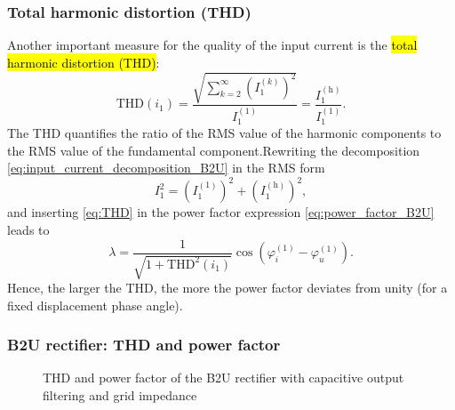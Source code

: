 \begin{frame}
	\frametitle{Total harmonic distortion (THD)}
	Another important measure for the quality of the input current is the \hl{total harmonic distortion (THD)}:
	\begin{equation}
		\mathrm{THD}(i_1) = \frac{\sqrt{\sum_{k=2}^{\infty} \left(I_1^{(k)}\right)^2}}{I_1^{(1)}} = \frac{I_1^{(\mathrm{h})}}{I_1^{(1)}}.
		\label{eq:THD}
	\end{equation}
	The THD quantifies the ratio of the RMS value of the harmonic components to the RMS value of the fundamental component.\pause Rewriting the decomposition \eqref{eq:input_current_decomposition_B2U} in the RMS form
	\begin{equation}
		I_1^2 = \left(I_1^{(1)}\right)^2 + \left(I_1^{(\mathrm{h})}\right)^2,
	\end{equation}\pause
	and inserting \eqref{eq:THD} in the power factor expression \eqref{eq:power_factor_B2U} leads to
	\begin{equation}
		\lambda = \frac{1}{\sqrt{1+\mathrm{THD}^2(i_1)}} \cos(\varphi_i^{(1)} - \varphi_u^{(1)}).
	\end{equation}
	Hence, the larger the THD, the more the power factor deviates from unity (for a fixed displacement phase angle).
\end{frame}

\begin{frame}
	\frametitle{B2U rectifier: THD and power factor}
	\begin{figure}
		\caption{THD and power factor of the B2U rectifier with capacitive output filtering and grid impedance}
		\label{fig:B2U_THD_power_factor}
	\end{figure}
\end{frame}

